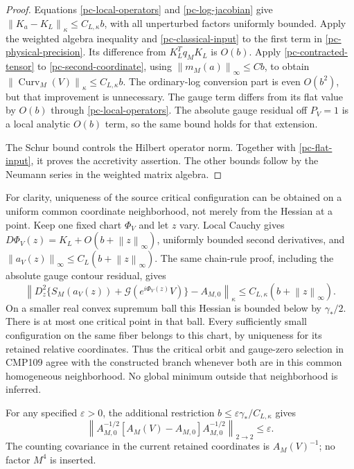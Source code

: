 \documentclass[11pt]{article}
\newcommand{\norm}[1]{\left\|#1\right\|}
\begin{document}
\begin{proof}
Equations \eqref{pc-local-operators} and
\eqref{pc-log-jacobian} give
$\norm{K_a-K_L}_\kappa\le C_{L,\kappa}b$, with all
unperturbed factors uniformly bounded. Apply the weighted
algebra inequality and \eqref{pc-classical-input} to the
first term in \eqref{pc-physical-precision}. Its difference
from $K_L^Tq_MK_L$ is $O(b)$. Apply
\eqref{pc-contracted-tensor} to
\eqref{pc-second-coordinate}, using
$\norm{m_M(a)}_\infty\le Cb$, to obtain
$\norm{\operatorname{Curv}_M(V)}_\kappa\le C_{L,\kappa}b$.
The ordinary-log conversion part is even $O(b^2)$, but that
improvement is unnecessary. The gauge term differs from its
flat value by $O(b)$ through \eqref{pc-local-operators}.
The absolute gauge residual off $P_V=1$ is a local analytic
$O(b)$ term, so the same bound holds for that extension.

The Schur bound controls the Hilbert operator norm. Together
with \eqref{pc-flat-input}, it proves the accretivity assertion.
The other bounds follow by the Neumann series in the weighted
matrix algebra.
\end{proof}

For clarity, uniqueness of the source critical configuration
can be obtained on a uniform common coordinate neighborhood,
not merely from the Hessian at a point. Keep one fixed chart
$\Phi_V$ and let $z$ vary. Local Cauchy gives
$D\Phi_V(z)=K_L+O(b+\norm z_\infty)$, uniformly bounded
second derivatives, and
$\norm{a_V(z)}_\infty\le C_L(b+\norm z_\infty)$.
The same chain-rule proof, including the absolute gauge
contour residual, gives
\begin{equation}\label{pc-uniform-convexity}
 \left\|D_z^2\{S_M(a_V(z))+
       \mathcal G(e^{i\Phi_V(z)}V)\}-A_{M,0}\right\|_\kappa
       \le C_{L,\kappa}(b+\norm z_\infty).
\end{equation}
On a smaller real convex supremum ball this Hessian is bounded
below by $\gamma_*/2$. There is at most one critical point in
that ball. Every sufficiently small configuration on the same
fiber belongs to this chart, by uniqueness for its retained
relative coordinates. Thus the critical orbit and gauge-zero
selection in CMP109 agree with the constructed branch whenever
both are in this common homogeneous neighborhood. No global
minimum outside that neighborhood is inferred.

For any specified $\varepsilon>0$, the additional restriction
$b\le\varepsilon\gamma_*/C_{L,\kappa}$ gives
\begin{equation}\label{pc-relative-precision}
 \norm{A_{M,0}^{-1/2}[A_M(V)-A_{M,0}]A_{M,0}^{-1/2}}_{2\to2}
       \le\varepsilon.
\end{equation}
The counting covariance in the current retained coordinates
is $A_M(V)^{-1}$; no factor $M^4$ is inserted.
\end{document}

